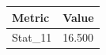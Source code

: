 \begin{tabular}{ll}
\toprule
Metric & Value \\
\midrule
Stat\_11 & 16.500 \\
\bottomrule
\end{tabular}